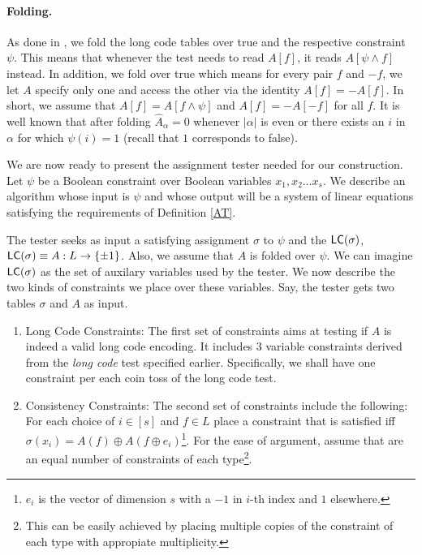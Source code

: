  \paragraph{Folding.} As done in \cite{BGS}, we fold the long code
 tables over true and the respective constraint $\psi$. This means
 that whenever the test needs to read $A[f]$, it reads $A[\psi \wedge
 f]$ instead. In addition, we fold over true which means for every
 pair $f$ and $-f$, we let $A$ specify only one and access the other
 via the identity $A[f] = - A[f]$. In short, we assume that $A[f] =
 A[f \wedge \psi]$ and $A[f] =- A[-f]$ for all $f$. It is well known
 that after folding $\hat{A}_\alpha = 0$ whenever $|\alpha|$ is even
 or there exists an $i$ in $\alpha$ for which $\psi(i) = 1$ (recall
 that $1$ corresponds to false).

 We are now ready to present the assignment tester needed for our
 construction. Let $\psi$ be a Boolean constraint over Boolean
 variables $x_1, x_2 \ldots x_s$. We describe an algorithm whose input
 is $\psi$ and whose output will be a system of linear equations
 satisfying the requirements of Definition \ref{AT}. 


 \noindent The tester seeks as input a satisfying assignment $\sigma$
 to $\psi$ and the ${\sf LC}(\sigma)$, ${\sf LC}(\sigma) \equiv A : L
 \rightarrow \{\pm 1\}$. Also, we assume that $A$ is folded over
 $\psi$. We can imagine ${\sf LC}(\sigma)$ as the set of auxilary variables
 used by the tester. We now describe the two kinds of constraints we
 place over these variables. Say, the tester gets two tables $\sigma$
 and $A$ as input.
	
\begin{enumerate}
\item {\sf Long Code Constraints:} The first set of constraints aims
  at testing if $A$ is indeed a valid long code encoding. It includes
  $3$ variable constraints derived from the {\em long code} test
  specified earlier. Specifically, we shall have one constraint per
  each coin toss of the long code test.

\item {\sf Consistency Constraints:} The second set of constraints
  include the following: For each choice of $i \in [s]$ and $f \in L$
  place a constraint that is satisfied iff $\sigma(x_i) = A(f) \oplus
  A(f \oplus e_i)$\footnote{$e_i$ is the vector of dimension $s$ with
    a $-1$ in $i$-th index and $1$ elsewhere.}. For the ease of
  argument, assume that are an equal number of constraints of each
  type\footnote{This can be easily achieved by placing multiple copies
    of the constraint of each type with appropiate multiplicity.}.
\end{enumerate}

